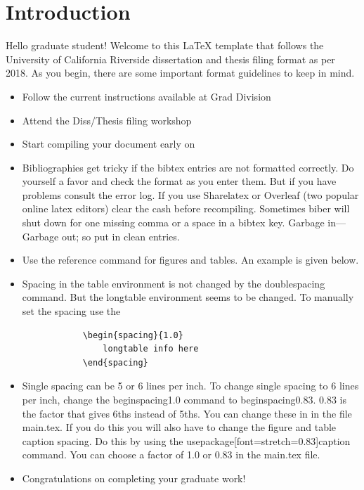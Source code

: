 \section{Introduction}

Hello graduate student! Welcome to this \LaTeX{} template that follows the University of California Riverside dissertation and thesis filing format as per 2018. As you begin, there are some important format guidelines to keep in mind.
    \begin{itemize}
        \item Follow the current instructions available at Grad Division
        \item Attend the Diss/Thesis filing workshop
        \item Start compiling your document early on
        \item Bibliographies get tricky if the bibtex entries are not formatted correctly. Do yourself a favor and check the format as you enter them. But if you have problems consult the error log. If you use Sharelatex or Overleaf (two popular online latex editors) clear the cash before recompiling. Sometimes biber will shut down for one missing comma or a space in a bibtex key. Garbage in---Garbage out; so put in clean entries.
        \item Use the reference command for figures and tables. An example is given below.
        \item Spacing in the table environment is not changed by the doublespacing command. But the longtable environment seems to be changed. To manually set the spacing use the \begin{verbatim}
            \begin{spacing}{1.0}
                longtable info here
            \end{spacing}
        \end{verbatim}
        \item Single spacing can be 5 or 6 lines per inch. To change single spacing to 6 lines per inch, change the begin{spacing}{1.0} command to begin{spacing}{0.83}. 0.83 is the factor that gives 6ths instead of 5ths. You can change these in in the file main.tex. If you do this you will also have to change the figure and table caption spacing. Do this by using the usepackage[font={stretch=0.83}]{caption} command. You can choose a factor of 1.0 or 0.83 in the main.tex file.
        \item Congratulations on completing your graduate work!
    \end{itemize}
    
